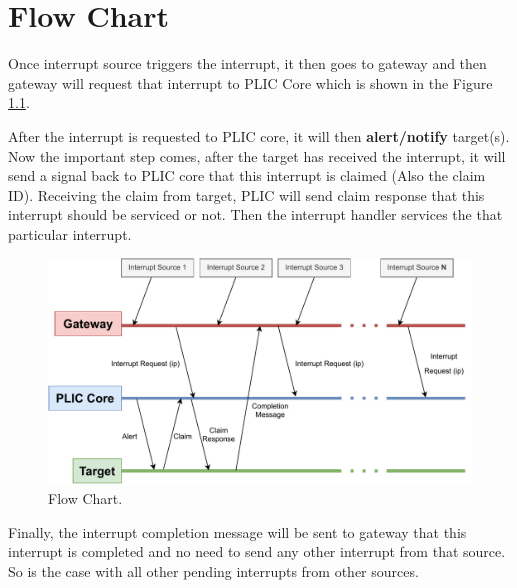 
\chapter{Flow Chart}
\label{Chapter8}

Once interrupt source triggers the interrupt, it then goes to gateway and then gateway will request that interrupt to PLIC Core which is shown in the Figure \ref{fig:flow_chart}. 

\par
After the interrupt is requested to PLIC core, it will then \textbf{alert/notify} target(s). Now the important step comes, after the target has received the interrupt, it will send a signal back to PLIC core that this interrupt is claimed (Also the claim ID). Receiving the claim from target, PLIC will send claim response that this interrupt should be serviced or not. Then the interrupt handler services the that particular interrupt. 


\begin{figure}[h]
  \centering
  \includegraphics[width=1\textwidth]{./Figures/flow_chart.pdf}
  \caption{Flow Chart.}
  \label{fig:flow_chart}
\end{figure}


Finally, the interrupt completion message will be sent to gateway that this interrupt is completed and no need to send any other interrupt from that source. So is the case with all other pending interrupts from other sources.

